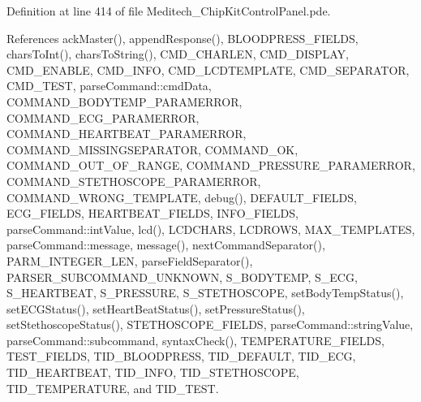 Definition at line 414 of file Meditech\-\_\-\-Chip\-Kit\-Control\-Panel.\-pde.



References ack\-Master(), append\-Response(), B\-L\-O\-O\-D\-P\-R\-E\-S\-S\-\_\-\-F\-I\-E\-L\-D\-S, chars\-To\-Int(), chars\-To\-String(), C\-M\-D\-\_\-\-C\-H\-A\-R\-L\-E\-N, C\-M\-D\-\_\-\-D\-I\-S\-P\-L\-A\-Y, C\-M\-D\-\_\-\-E\-N\-A\-B\-L\-E, C\-M\-D\-\_\-\-I\-N\-F\-O, C\-M\-D\-\_\-\-L\-C\-D\-T\-E\-M\-P\-L\-A\-T\-E, C\-M\-D\-\_\-\-S\-E\-P\-A\-R\-A\-T\-O\-R, C\-M\-D\-\_\-\-T\-E\-S\-T, parse\-Command\-::cmd\-Data, C\-O\-M\-M\-A\-N\-D\-\_\-\-B\-O\-D\-Y\-T\-E\-M\-P\-\_\-\-P\-A\-R\-A\-M\-E\-R\-R\-O\-R, C\-O\-M\-M\-A\-N\-D\-\_\-\-E\-C\-G\-\_\-\-P\-A\-R\-A\-M\-E\-R\-R\-O\-R, C\-O\-M\-M\-A\-N\-D\-\_\-\-H\-E\-A\-R\-T\-B\-E\-A\-T\-\_\-\-P\-A\-R\-A\-M\-E\-R\-R\-O\-R, C\-O\-M\-M\-A\-N\-D\-\_\-\-M\-I\-S\-S\-I\-N\-G\-S\-E\-P\-A\-R\-A\-T\-O\-R, C\-O\-M\-M\-A\-N\-D\-\_\-\-O\-K, C\-O\-M\-M\-A\-N\-D\-\_\-\-O\-U\-T\-\_\-\-O\-F\-\_\-\-R\-A\-N\-G\-E, C\-O\-M\-M\-A\-N\-D\-\_\-\-P\-R\-E\-S\-S\-U\-R\-E\-\_\-\-P\-A\-R\-A\-M\-E\-R\-R\-O\-R, C\-O\-M\-M\-A\-N\-D\-\_\-\-S\-T\-E\-T\-H\-O\-S\-C\-O\-P\-E\-\_\-\-P\-A\-R\-A\-M\-E\-R\-R\-O\-R, C\-O\-M\-M\-A\-N\-D\-\_\-\-W\-R\-O\-N\-G\-\_\-\-T\-E\-M\-P\-L\-A\-T\-E, debug(), D\-E\-F\-A\-U\-L\-T\-\_\-\-F\-I\-E\-L\-D\-S, E\-C\-G\-\_\-\-F\-I\-E\-L\-D\-S, H\-E\-A\-R\-T\-B\-E\-A\-T\-\_\-\-F\-I\-E\-L\-D\-S, I\-N\-F\-O\-\_\-\-F\-I\-E\-L\-D\-S, parse\-Command\-::int\-Value, lcd(), L\-C\-D\-C\-H\-A\-R\-S, L\-C\-D\-R\-O\-W\-S, M\-A\-X\-\_\-\-T\-E\-M\-P\-L\-A\-T\-E\-S, parse\-Command\-::message, message(), next\-Command\-Separator(), P\-A\-R\-M\-\_\-\-I\-N\-T\-E\-G\-E\-R\-\_\-\-L\-E\-N, parse\-Field\-Separator(), P\-A\-R\-S\-E\-R\-\_\-\-S\-U\-B\-C\-O\-M\-M\-A\-N\-D\-\_\-\-U\-N\-K\-N\-O\-W\-N, S\-\_\-\-B\-O\-D\-Y\-T\-E\-M\-P, S\-\_\-\-E\-C\-G, S\-\_\-\-H\-E\-A\-R\-T\-B\-E\-A\-T, S\-\_\-\-P\-R\-E\-S\-S\-U\-R\-E, S\-\_\-\-S\-T\-E\-T\-H\-O\-S\-C\-O\-P\-E, set\-Body\-Temp\-Status(), set\-E\-C\-G\-Status(), set\-Heart\-Beat\-Status(), set\-Pressure\-Status(), set\-Stethoscope\-Status(), S\-T\-E\-T\-H\-O\-S\-C\-O\-P\-E\-\_\-\-F\-I\-E\-L\-D\-S, parse\-Command\-::string\-Value, parse\-Command\-::subcommand, syntax\-Check(), T\-E\-M\-P\-E\-R\-A\-T\-U\-R\-E\-\_\-\-F\-I\-E\-L\-D\-S, T\-E\-S\-T\-\_\-\-F\-I\-E\-L\-D\-S, T\-I\-D\-\_\-\-B\-L\-O\-O\-D\-P\-R\-E\-S\-S, T\-I\-D\-\_\-\-D\-E\-F\-A\-U\-L\-T, T\-I\-D\-\_\-\-E\-C\-G, T\-I\-D\-\_\-\-H\-E\-A\-R\-T\-B\-E\-A\-T, T\-I\-D\-\_\-\-I\-N\-F\-O, T\-I\-D\-\_\-\-S\-T\-E\-T\-H\-O\-S\-C\-O\-P\-E, T\-I\-D\-\_\-\-T\-E\-M\-P\-E\-R\-A\-T\-U\-R\-E, and T\-I\-D\-\_\-\-T\-E\-S\-T.



